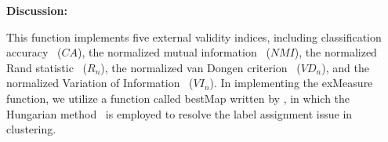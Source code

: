 \documentclass[10pt]{acmtrans2e}
\newenvironment{remark}
{\vspace*{0.1cm}
\noindent \textbf{Discussion:} \medskip

}
{
\vspace*{0.2cm}
}
\begin{document}
\begin{remark}
\noindent This function implements five external validity indices, including classification accuracy~\cite{nguyen2007consensus} ($CA$), the normalized mutual information~\cite{cover2012elements} ($NMI$), the normalized Rand statistic~\cite{rand1971objective} ($R_n$), the normalized van Dongen criterion~\cite{dongen2000performance} ($VD_n$), and the normalized Variation of Information~\cite{cover2012elements} ($VI_n$). In implementing the \textsf{exMeasure} function, we utilize a function called \textsf{bestMap} written by \cite{CHH05}, in which the Hungarian method~\cite{carpaneto1980algorithm} is employed to resolve the label assignment issue in clustering.
\end{remark}

\begin{small}


\end{small}
\end{document}
